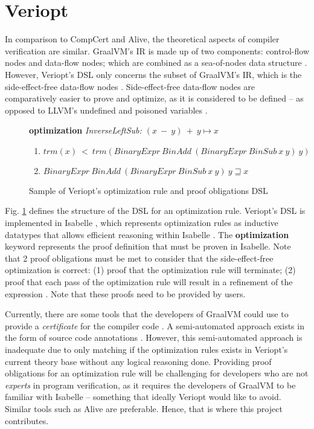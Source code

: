 \section{Veriopt}
\label{sec:Veriopt}

In comparison to CompCert and Alive, the theoretical aspects of compiler verification are similar. GraalVM's IR is made up of two components: 
control-flow nodes and data-flow nodes; which are combined as a sea-of-nodes data structure \cite{ATVA21_GraalVM_IR_Semantics}. However, 
Veriopt's DSL only concerns the subset of GraalVM's IR, which is the side-effect-free data-flow nodes \cite{Term_Graph_Optimizations}.
Side-effect-free data-flow nodes are comparatively easier to prove and optimize, as it is considered to be defined -- as opposed to LLVM's undefined 
and poisoned variables \cite{Alive2}.

\begin{figure}[h]
    \textbf{optimization} \emph{InverseLeftSub: \((x\ -\ y)\ +\ y \longmapsto x\)}
    \begin{enumerate}
        \item \(trm(x)\ <\ trm(BinaryExpr\ BinAdd\ (BinaryExpr\ BinSub\ x\ y)\ y)\)
        \item \(BinaryExpr\ BinAdd\ (BinaryExpr\ BinSub\ x\ y)\ y \sqsupseteq x\)
    \end{enumerate}

    \caption{Sample of Veriopt's optimization rule and proof obligations DSL \cite[Fig. 3]{Term_Graph_Optimizations}}
    \label{fig:VerioptDSLSample}
\end{figure}

Fig. \ref{fig:VerioptDSLSample} defines the structure of the DSL for an optimization rule. Veriopt's DSL is implemented in Isabelle 
\cite{IsabelleHOL}, which represents optimization rules as inductive datatypes that allows efficient reasoning within Isabelle 
\cite[Sec. 3]{ATVA21_GraalVM_IR_Semantics} \cite{biendarra_ning_2024}. 
The \textbf{optimization} keyword represents the proof definition that must be proven in Isabelle. 
Note that 2 proof obligations must be met to consider that the side-effect-free optimization is correct: 
(1) proof that the optimization rule will terminate; (2) proof that each pass of the optimization rule will 
result in a refinement of the expression \cite{Term_Graph_Optimizations}. Note that these proofs need to be provided by users.

Currently, there are some tools that the developers of GraalVM could use to provide a \emph{certificate} for the compiler code 
\cite[Sec. 7]{Term_Graph_Optimizations}. A semi-automated approach exists in the form of source code annotations \cite[Sec. 5.1]{Term_Graph_Optimizations}.
However, this semi-automated approach is inadequate due to only matching if the optimization rules exists in Veriopt's current theory base without 
any logical reasoning done. Providing proof obligations for an optimization rule will be challenging for developers who are not 
\emph{experts} in program verification, as it requires the developers of GraalVM to be familiar with Isabelle -- something that ideally Veriopt 
would like to avoid. Similar tools such as Alive \cite{AliveInLean} are preferable. Hence, that is where this project contributes.